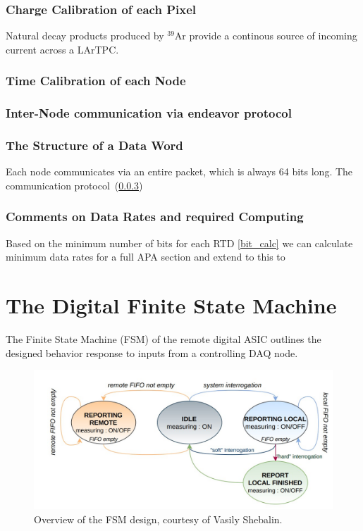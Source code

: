 \subsubsection{Charge Calibration of each Pixel}

Natural decay products produced by $^39$Ar provide a continous source of incoming current across a LArTPC.


\subsubsection{Time Calibration of each Node}

\subsubsection{Inter-Node communication via endeavor protocol}
\label{sect:endeavor}


\subsubsection{The Structure of a Data Word}

Each node communicates via an entire packet, which is always 64 bits long. 
The communication protocol~(\ref{sect:endeavor})

\subsubsection{Comments on Data Rates and required Computing}

Based on the minimum number of bits for each RTD \ref{bit_calc} we can calculate minimum data rates for a full APA section and extend to this to 


\section{The Digital Finite State Machine}

The Finite State Machine (FSM) of the remote digital ASIC outlines the designed behavior response to inputs from a controlling DAQ node.

\begin{figure}[]
\centering
\includegraphics[width=\textwidth]{images/digital_fsm_overview.jpg}
\caption{Overview of the FSM design, courtesy of Vasily Shebalin.}
\end{figure}

